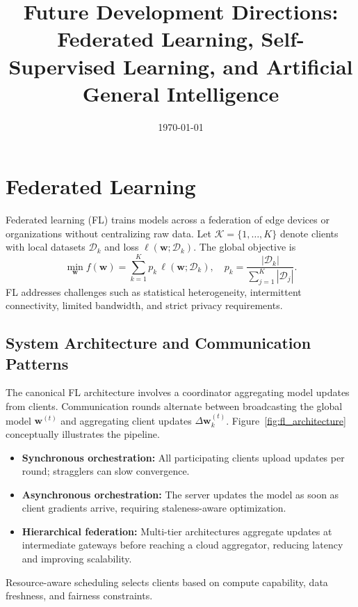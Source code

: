 \documentclass{article}
\title{Future Development Directions: Federated Learning, Self-Supervised Learning, and Artificial General Intelligence}
\author{}
\date{\today}
\begin{document}
\maketitle
\tableofcontents
\FloatBarrier

\section{Federated Learning}
Federated learning (FL) trains models across a federation of edge devices or organizations without centralizing raw data. Let $\mathcal{K} = \{1, \ldots, K\}$ denote clients with local datasets $\mathcal{D}_k$ and loss $\ell(\mathbf{w}; \mathcal{D}_k)$. The global objective is
\begin{equation}
  \min_{\mathbf{w}} f(\mathbf{w}) = \sum_{k=1}^{K} p_k \, \ell(\mathbf{w}; \mathcal{D}_k), \quad p_k = \frac{|\mathcal{D}_k|}{\sum_{j=1}^{K} |\mathcal{D}_j|}.
\end{equation}
FL addresses challenges such as statistical heterogeneity, intermittent connectivity, limited bandwidth, and strict privacy requirements.

\subsection{System Architecture and Communication Patterns}
The canonical FL architecture involves a coordinator aggregating model updates from clients. Communication rounds alternate between broadcasting the global model $\mathbf{w}^{(t)}$ and aggregating client updates $\Delta \mathbf{w}_k^{(t)}$. Figure~\ref{fig:fl_architecture} conceptually illustrates the pipeline.
\begin{itemize}
  \item \textbf{Synchronous orchestration:} All participating clients upload updates per round; stragglers can slow convergence.
  \item \textbf{Asynchronous orchestration:} The server updates the model as soon as client gradients arrive, requiring staleness-aware optimization.
  \item \textbf{Hierarchical federation:} Multi-tier architectures aggregate updates at intermediate gateways before reaching a cloud aggregator, reducing latency and improving scalability.
\end{itemize}
Resource-aware scheduling selects clients based on compute capability, data freshness, and fairness constraints.
\end{document}
